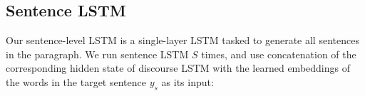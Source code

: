 \documentclass[11pt,a4paper]{article}
\begin{document}


\subsection{Sentence LSTM}
Our sentence-level LSTM is a single-layer LSTM tasked to generate all sentences in the paragraph.
We run sentence LSTM $S$ times, and use concatenation of the corresponding hidden state of discourse LSTM with the learned embeddings of the words in the target sentence $y_s$ as its input:
\end{document}
